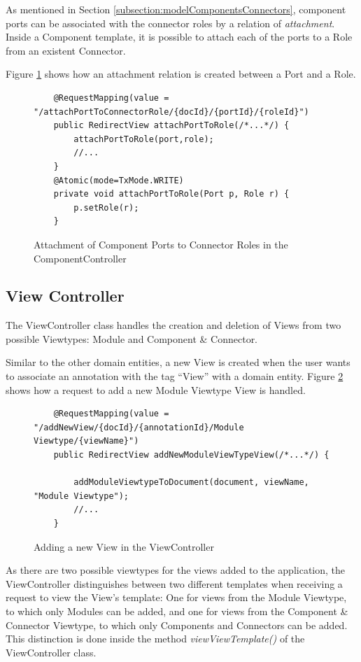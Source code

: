 As mentioned in Section \ref{subsection:modelComponentsConnectors}, component ports can be associated with the connector roles by a relation of \textit{attachment}. Inside a Component template, it is possible to attach each of the ports to a Role from an existent Connector.

Figure \ref{figure:ComponentControllerAttachment} shows how an attachment relation is created between a Port and a Role.

\begin{figure}[h]
\lstset{style=customjava}
\begin{lstlisting}
	@RequestMapping(value = "/attachPortToConnectorRole/{docId}/{portId}/{roleId}")
	public RedirectView attachPortToRole(/*...*/) {
		attachPortToRole(port,role);
		//...
	}
	@Atomic(mode=TxMode.WRITE)
	private void attachPortToRole(Port p, Role r) {
		p.setRole(r);
	}
\end{lstlisting}
\caption{Attachment of Component Ports to Connector Roles in the ComponentController}
\label{figure:ComponentControllerAttachment}
\end{figure}

\subsection{View Controller}
\label{substection:viewController}

The ViewController class handles the creation and deletion of Views from two possible Viewtypes: Module and Component \& Connector. 

Similar to the other domain entities, a new View is created when the user wants to associate an annotation with the tag ``View'' with a domain entity. Figure \ref{figure:ViewControllerAddModuleViewtype} shows how a request to add a new Module Viewtype View is handled.

\begin{figure}[h]
\lstset{style=customjava}
\begin{lstlisting}
	@RequestMapping(value = "/addNewView/{docId}/{annotationId}/Module Viewtype/{viewName}")
	public RedirectView addNewModuleViewTypeView(/*...*/) {
	
		addModuleViewtypeToDocument(document, viewName, "Module Viewtype");
		//...
	}
\end{lstlisting}
\caption{Adding a new View in the ViewController}
\label{figure:ViewControllerAddModuleViewtype}
\end{figure}

As there are two possible viewtypes for the views added to the application, the ViewController distinguishes between two different templates when receiving a request to view the View's template: One for views from the Module Viewtype, to which only Modules can be added, and one for views from the Component \& Connector Viewtype, to which only Components and Connectors can be added. This distinction is done inside the method \textit{viewViewTemplate()} of the ViewController class. 

